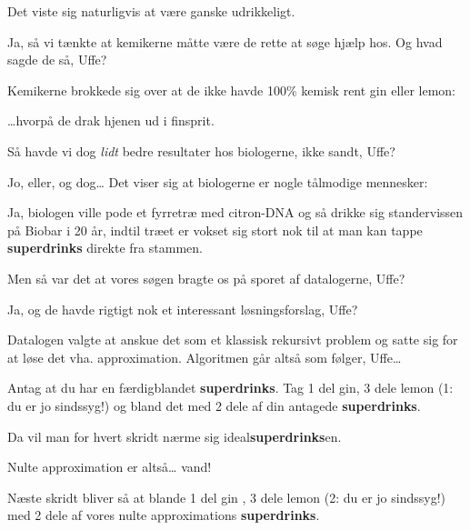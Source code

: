 \documentclass[a4paper,11pt]{article}
\newcommand{\sd}{\textbf{superdrinks}}
\begin{document}
\begin{sketch}
   Det viste sig naturligvis at være ganske udrikkeligt.

   Ja, så vi tænkte at kemikerne måtte være de rette at søge
  hjælp hos. Og hvad sagde de så, Uffe?

   Kemikerne brokkede sig over at de ikke havde 100\% kemisk rent gin
  eller lemon:


   \ldots{}hvorpå de drak hjenen ud i finsprit.

   Så havde vi dog \emph{lidt} bedre resultater hos biologerne, ikke sandt, Uffe?

   Jo, eller, og dog\ldots{} Det viser sig at biologerne er
  nogle tålmodige mennesker:


   Ja, biologen ville pode et fyrretræ med citron-DNA og så
  drikke sig standervissen på Biobar i 20 år, indtil træet er vokset
  sig stort nok til at man kan tappe \sd{} direkte fra stammen.

   Men så var det at vores søgen bragte os på sporet af
  datalogerne, Uffe?

   Ja, og de havde rigtigt nok et interessant løsningsforslag,
  Uffe?

   Datalogen valgte at anskue det som et klassisk rekursivt
  problem og satte sig for at løse det vha. approximation. Algoritmen
  går altså som følger, Uffe\ldots

   Antag at du har en færdigblandet \sd. Tag 1 del gin, 3 dele
  lemon (1: du er jo sindssyg!) og bland det med 2 dele af din antagede \sd.

   Da vil man for hvert skridt nærme sig ideal\sd{}en.


   Nulte approximation er altså\ldots{} vand! 


   Næste skridt bliver så at blande 1 del gin , 3 dele lemon (2: du er jo sindssyg!)
    med 2 dele af vores nulte approximations \sd. 


\end{sketch}
\end{document}
